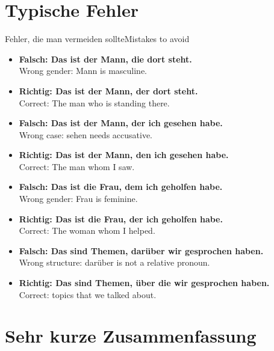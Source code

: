 \documentclass[a4paper,11pt]{article}
\newcommand{\ExampleItem}[2]{\item \textbf{#1}\\{\small\color{SoftGray}#2}}
\begin{document}
    
    \section{Typische Fehler}
        
        \begin{grammarentry}{Fehler, die man vermeiden sollte}{Mistakes to avoid}
            \begin{exbox}
                \begin{itemize}
                    \ExampleItem{Falsch: Das ist der Mann, die dort steht.}{Wrong gender: Mann is masculine.}
                    \ExampleItem{Richtig: Das ist der Mann, der dort steht.}{Correct: The man who is standing there.}
                    
                    \ExampleItem{Falsch: Das ist der Mann, der ich gesehen habe.}{Wrong case: sehen needs accusative.}
                    \ExampleItem{Richtig: Das ist der Mann, den ich gesehen habe.}{Correct: The man whom I saw.}
                    
                    \ExampleItem{Falsch: Das ist die Frau, dem ich geholfen habe.}{Wrong gender: Frau is feminine.}
                    \ExampleItem{Richtig: Das ist die Frau, der ich geholfen habe.}{Correct: The woman whom I helped.}
                    
                    \ExampleItem{Falsch: Das sind Themen, darüber wir gesprochen haben.}{Wrong structure: darüber is not a relative pronoun.}
                    \ExampleItem{Richtig: Das sind Themen, über die wir gesprochen haben.}{Correct: topics that we talked about.}
                \end{itemize}
            \end{exbox}
        \end{grammarentry}
    
    
    \section{Sehr kurze Zusammenfassung}
        
\end{document}
